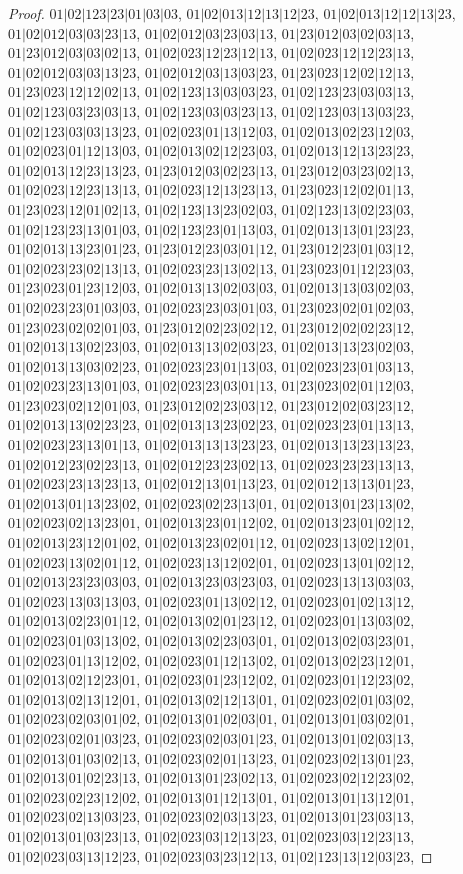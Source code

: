 \documentclass[12pt]{article}
\theoremstyle{plain}
\theoremstyle{definition}
\theoremstyle{remark}
\begin{document}
\begin{proof}
$01|02|123|23|01|03|03$, $01|02|013|12|13|12|23$, $01|02|013|12|12|13|23$, $01|02|012|03|03|23|13$, $01|02|012|03|23|03|13$, $01|23|012|03|02|03|13$, $01|23|012|03|03|02|13$, $01|02|023|12|23|12|13$, $01|02|023|12|12|23|13$, $01|02|012|03|03|13|23$, $01|02|012|03|13|03|23$, $01|23|023|12|02|12|13$, $01|23|023|12|12|02|13$, $01|02|123|13|03|03|23$, $01|02|123|23|03|03|13$, $01|02|123|03|23|03|13$, $01|02|123|03|03|23|13$, $01|02|123|03|13|03|23$, $01|02|123|03|03|13|23$, $01|02|023|01|13|12|03$, $01|02|013|02|23|12|03$, $01|02|023|01|12|13|03$, $01|02|013|02|12|23|03$, $01|02|013|12|13|23|23$, $01|02|013|12|23|13|23$, $01|23|012|03|02|23|13$, $01|23|012|03|23|02|13$, $01|02|023|12|23|13|13$, $01|02|023|12|13|23|13$, $01|23|023|12|02|01|13$, $01|23|023|12|01|02|13$, $01|02|123|13|23|02|03$, $01|02|123|13|02|23|03$, $01|02|123|23|13|01|03$, $01|02|123|23|01|13|03$, $01|02|013|13|01|23|23$, $01|02|013|13|23|01|23$, $01|23|012|23|03|01|12$, $01|23|012|23|01|03|12$, $01|02|023|23|02|13|13$, $01|02|023|23|13|02|13$, $01|23|023|01|12|23|03$, $01|23|023|01|23|12|03$, $01|02|013|13|02|03|03$, $01|02|013|13|03|02|03$, $01|02|023|23|01|03|03$, $01|02|023|23|03|01|03$, $01|23|023|02|01|02|03$, $01|23|023|02|02|01|03$, $01|23|012|02|23|02|12$, $01|23|012|02|02|23|12$, $01|02|013|13|02|23|03$, $01|02|013|13|02|03|23$, $01|02|013|13|23|02|03$, $01|02|013|13|03|02|23$, $01|02|023|23|01|13|03$, $01|02|023|23|01|03|13$, $01|02|023|23|13|01|03$, $01|02|023|23|03|01|13$, $01|23|023|02|01|12|03$, $01|23|023|02|12|01|03$, $01|23|012|02|23|03|12$, $01|23|012|02|03|23|12$, $01|02|013|13|02|23|23$, $01|02|013|13|23|02|23$, $01|02|023|23|01|13|13$, $01|02|023|23|13|01|13$, $01|02|013|13|13|23|23$, $01|02|013|13|23|13|23$, $01|02|012|23|02|23|13$, $01|02|012|23|23|02|13$, $01|02|023|23|23|13|13$, $01|02|023|23|13|23|13$, $01|02|012|13|01|13|23$, $01|02|012|13|13|01|23$, $01|02|013|01|13|23|02$, $01|02|023|02|23|13|01$, $01|02|013|01|23|13|02$, $01|02|023|02|13|23|01$, $01|02|013|23|01|12|02$, $01|02|013|23|01|02|12$, $01|02|013|23|12|01|02$, $01|02|013|23|02|01|12$, $01|02|023|13|02|12|01$, $01|02|023|13|02|01|12$, $01|02|023|13|12|02|01$, $01|02|023|13|01|02|12$, $01|02|013|23|23|03|03$, $01|02|013|23|03|23|03$, $01|02|023|13|13|03|03$, $01|02|023|13|03|13|03$, $01|02|023|01|13|02|12$, $01|02|023|01|02|13|12$, $01|02|013|02|23|01|12$, $01|02|013|02|01|23|12$, $01|02|023|01|13|03|02$, $01|02|023|01|03|13|02$, $01|02|013|02|23|03|01$, $01|02|013|02|03|23|01$, $01|02|023|01|13|12|02$, $01|02|023|01|12|13|02$, $01|02|013|02|23|12|01$, $01|02|013|02|12|23|01$, $01|02|023|01|23|12|02$, $01|02|023|01|12|23|02$, $01|02|013|02|13|12|01$, $01|02|013|02|12|13|01$, $01|02|023|02|01|03|02$, $01|02|023|02|03|01|02$, $01|02|013|01|02|03|01$, $01|02|013|01|03|02|01$, $01|02|023|02|01|03|23$, $01|02|023|02|03|01|23$, $01|02|013|01|02|03|13$, $01|02|013|01|03|02|13$, $01|02|023|02|01|13|23$, $01|02|023|02|13|01|23$, $01|02|013|01|02|23|13$, $01|02|013|01|23|02|13$, $01|02|023|02|12|23|02$, $01|02|023|02|23|12|02$, $01|02|013|01|12|13|01$, $01|02|013|01|13|12|01$, $01|02|023|02|13|03|23$, $01|02|023|02|03|13|23$, $01|02|013|01|23|03|13$, $01|02|013|01|03|23|13$, $01|02|023|03|12|13|23$, $01|02|023|03|12|23|13$, $01|02|023|03|13|12|23$, $01|02|023|03|23|12|13$, $01|02|123|13|12|03|23$, 
\end{proof}
\end{document}
